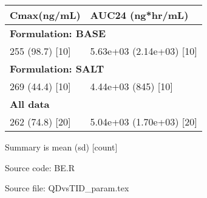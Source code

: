 \setlength{\tabcolsep}{5pt} 
\begin{threeparttable}
\renewcommand{\arraystretch}{1.3}
\begin{tabular}[h]{ll}
\hline
\textbf{Cmax(ng/mL)} & \textbf{AUC24 (ng*hr/mL)} \\
\hline
\multicolumn{2}{l}{\textbf{Formulation: BASE}}\\%
255 (98.7) [10] & 5.63e+03 (2.14e+03) [10] \\
\hline \multicolumn{2}{l}{\textbf{Formulation: SALT}}\\%
269 (44.4) [10] & 4.44e+03 (845) [10] \\
\hline \multicolumn{2}{l}{\textbf{All data}}\\%
262 (74.8) [20] & 5.04e+03 (1.70e+03) [20] \\
\hline
\end{tabular}
\begin{tablenotes}[flushleft]
\item Summary is mean (sd) [count]
\item Source code: BE.R
\item Source file: QDvsTID\_param.tex
\end{tablenotes}
\end{threeparttable}
